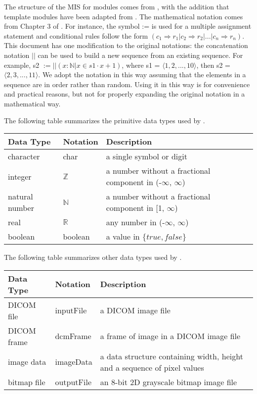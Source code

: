 \documentclass[12pt, titlepage]{article}
\begin{document}
The structure of the MIS for modules comes from \citet{HoffmanAndStrooper1995},
with the addition that template modules have been adapted from
\cite{GhezziEtAl2003}.  The mathematical notation comes from Chapter 3 of
\citet{HoffmanAndStrooper1995}.  For instance, the symbol := is used for a
multiple assignment statement and conditional rules follow the form $(c_1
\Rightarrow r_1 | c_2 \Rightarrow r_2 | ... | c_n \Rightarrow r_n )$. This
document has one modification to the original notations: the concatenation
notation $||$ can be used to build a new sequence from an existing sequence.
For example, s2 $:= ||(x : \mathbb{N} | x \in s1 \cdot x+1)$, where s1 =
$\langle1,2,...,10 \rangle$, then s2 = $\langle 2,3,...,11 \rangle$. We adopt
the
notation in this way assuming that the elements in a sequence are in order
rather than random. Using it in this way is for convenience and practical
reasons, but not for properly expanding the original notation in a mathematical
way. 

The following table summarizes the primitive data types used by \progname. 

\begin{center}
\renewcommand{\arraystretch}{1.2}
\noindent 
\begin{tabular}{l l p{7.5cm}} 
\toprule 
\textbf{Data Type} & \textbf{Notation} & \textbf{Description}\\ 
\midrule
character & char & a single symbol or digit\\
integer & $\mathbb{Z}$ & a number without a fractional component in (-$\infty$,
$\infty$) \\
natural number & $\mathbb{N}$ & a number without a fractional component in [1,
$\infty$) \\
real & $\mathbb{R}$ & any number in (-$\infty$, $\infty$)\\
boolean & boolean & a value in $\{true, false\}$\\
\bottomrule
\end{tabular} 
\end{center}

The following table summarizes other data types used by \progname.
\begin{center}
\renewcommand{\arraystretch}{1.2}
\noindent 
\begin{tabular}{l l p{7.5cm}} 
\toprule 
\textbf{Data Type} & \textbf{Notation} & \textbf{Description}\\ 
\midrule
DICOM file & inputFile & a DICOM image file\\
DICOM frame & dcmFrame & a frame of image in a DICOM image file\\
image data & imageData & a data structure containing width, height and a
sequence of pixel values\\
bitmap file & outputFile & an 8-bit 2D grayscale bitmap image file\\
\bottomrule
\end{tabular} 
\end{center}
\end{document}
